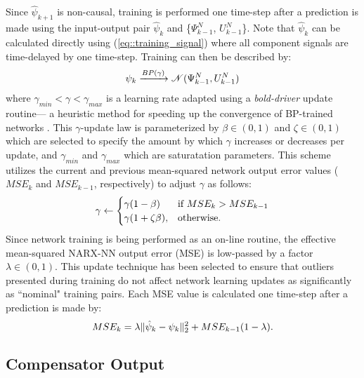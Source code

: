Since $\hat{\psi}_{k+1}$ is non-causal, training is performed one time-step after a prediction is made using the input-output pair $\hat{\psi}_{k}$ and \{${\Psi}_{k-1}^{N}$, ${U}_{k-1}^{N}$\}. Note that $\hat{\psi}_{k}$ can be calculated directly using (\ref{eq::training_signal}) where all component signals are time-delayed by one time-step. Training can then be described by:
	\begin{equation}
		\vspace{-1mm}
		\psi_{k} \xrightarrow{BP(\gamma)} \mathscr{N}({\Psi}_{k-1}^{N},{U}_{k-1}^{N})
		\label{eq::training}
	\end{equation}
where $\gamma _{min} < \gamma < \gamma _{max}$ is a learning rate adapted using a \emph{bold-driver} update routine--- a heuristic method for speeding up the convergence of BP-trained networks \cite{Battiti1992,Magoulas1999}. This $\gamma$-update law is parameterized by $\beta \in (0,1)$ and $\zeta \in (0,1)$ which are selected to specify the amount by which $\gamma$ increases or decreases per update, and $\gamma _{min}$ and $\gamma _{max}$ which are saturatation parameters. This scheme utilizes the current and previous mean-squared network output error values ($MSE_{k}$ and $MSE_{k-1}$, respectively) to adjust $\gamma$ as follows:
	\begin{equation}
		\vspace{-1mm}
	    \gamma \leftarrow 
		\begin{cases}
	    \gamma (1- \beta) 		& \text{if } MSE_{k} > MSE_{k-1}\\
	    \gamma (1+\zeta \beta),& \text{otherwise}.
		\end{cases}
	\end{equation}
Since network training is being performed as an on-line routine, the effective mean-squared NARX-NN  output error (MSE) is low-passed by a factor $\lambda \in \left(0,1\right)$. This update technique has been selected to ensure that outliers presented during training do not affect network learning updates as significantly as ``nominal" training pairs. Each \kth \hspace{0.25mm} MSE value is calculated one time-step after a prediction is made by:
	\begin{equation}
		\vspace{-1mm}
		MSE_{k} = \lambda \|\hat{\psi}_{k} - \psi_{k}\|_{2}^{2} + MSE_{k-1}(1-\lambda).
	\end{equation}


\subsection{Compensator Output}

